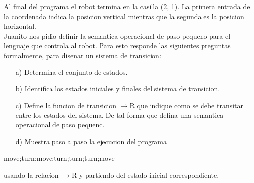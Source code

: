 \documentclass{article}
\begin{document}
\begin{itemize}
            Al final del programa el robot termina en la casilla (2, 1). La primera entrada de la coordenada
            indica la posicion vertical mientras que la segunda es la posicion horizontal.\\ 
            Juanito nos pidio definir la semantica operacional de paso pequeno para el lenguaje que controla al robot. Para esto responde las siguientes preguntas formalmente, para disenar un sistema de transicion:
                \begin{itemize}
                    \item[a)] Determina el conjunto de estados.
                    \item[b)] Identifica los estados iniciales y finales del sistema de transicion.
                    \item[c)] Define la funcion de transicion $\rightarrow$R que indique como se debe transitar entre los estados del sistema. De tal forma que defina una semantica operacional de paso pequeno.
                    \item[d)] Muestra paso a paso la ejecucion del programa
                \end{itemize}
                \begin{center}
                    move;turn;move;turn;turn;turn;move
                \end{center}
            usando la relacion $\rightarrow$R y partiendo del estado inicial correspondiente.
    \end{itemize}
\end{document}
